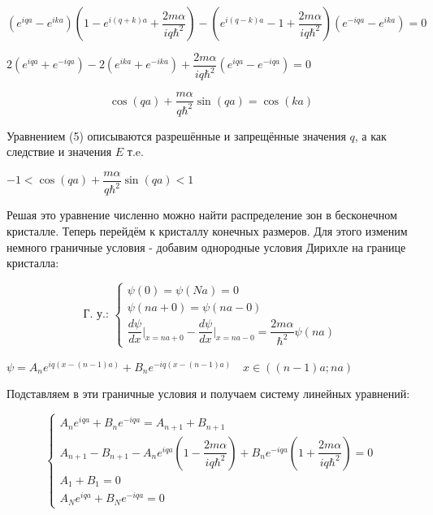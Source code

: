 \documentclass[a4paper, 12pt]{article}
\begin{document}
	\begin{center}
		$(e^{iqa} - e^{ika} ) \left(1 - e^{i(q+k)a} + \dfrac{2m\alpha}{iq\hbar^2}\right) - \left(e^{i(q-k)a} -1 + \dfrac{2m\alpha}{iq\hbar^2} \right) (e^{-iqa} - e^{ika}) = 0$
		
		$2(e^{iqa} + e^{-iqa}) - 2(e^{ika} + e^{-ika}) + \dfrac{2m\alpha}{iq\hbar^2} (e^{iqa} - e^{-iqa}) = 0$
	\end{center}
	
	\begin{equation}
		\cos(qa)  + \dfrac{m\alpha}{q\hbar^2} \sin(qa) = \cos(ka) 
	\end{equation}
	
	\quad Уравнением (5) описываются разрешённые и запрещённые значения $q$, а как следствие и значения $E$ т.e. 
	
	\begin{center}
		$ -1 < \cos(qa)  + \dfrac{m\alpha}{q\hbar^2} \sin(qa) < 1$ 
	\end{center}
	
	\quad Решая это уравнение численно можно найти распределение зон в бесконечном кристалле. Теперь перейдём к кристаллу конечных размеров. Для этого изменим немного граничные условия - добавим однородные условия Дирихле на границе кристалла: 
	
	\begin{equation}
		\text{Г. у.: } \begin{cases}
			\psi(0) = \psi(Na) = 0 \\ 
			\psi(na+0) = \psi(na-0) \\
			\dfrac{d\psi }{dx} \bigg|_{x = na+0} - \dfrac{d\psi }{dx} \bigg|_{x = na-0} = \dfrac{2 m \alpha}{\hbar^2}\psi(na)
		\end{cases}
	\end{equation}
	
	\begin{center}
		$\psi = A_n e^{iq(x - (n-1)a)} + B_n e^{-iq(x - (n-1)a)} \quad x \in ((n-1)a; na)$
	\end{center}
	
	\quad Подставляем в эти граничные условия и получаем систему линейных уравнений: 
	
	\begin{equation}
		\begin{cases}
			A_n e^{iqa} + B_n e^{-iqa} = A_{n+1} + B_{n+1} \\
			A_{n+1} - B_{n+1} - A_n e^{iqa} \left(1 - \dfrac{2m\alpha}{iq\hbar^2} \right) + B_n e^{-iqa} \left(1 + \dfrac{2m\alpha}{iq\hbar^2} \right) = 0 \\
			A_1 + B_1 = 0 \\
			A_N e^{iqa} + B_N e^{-iqa} = 0
		\end{cases}
	\end{equation}
	
\end{document}
